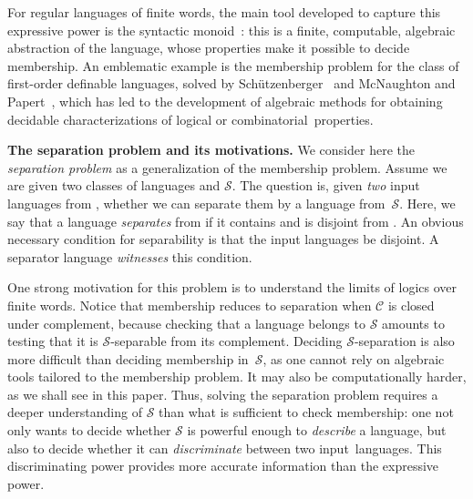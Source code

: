 \documentclass{LMCS}
\newcommand\mypar[1]{\par\medskip\noindent\textbf{#1}}
\newcommand\Sep{\ensuremath{\mathcal{S}}\xspace}
\newcommand\C{\ensuremath{\mathcal{C}}\xspace}
\theoremstyle{plain}
\begin{document}
For regular languages of finite words, the main tool developed to
capture this expressive power is the syntactic
monoid~\cite{pin:hal-00143946}: this is a finite, computable, algebraic
abstraction of the language, whose properties make it possible to
decide  membership. An emblematic example is the membership problem
for the class of first-order definable languages, solved by
Sch\"utzenberger~\cite{Schutzenberger:finite-monoids-having-only:1965:a}
and McNaughton and Papert~\cite{mcnaughton&papert:1971:counter}, which
has led to the development of algebraic methods for obtaining
decidable characterizations of logical
or combinatorial~properties.

\mypar{The separation problem and its motivations.} We consider here the
\emph{separation problem} as a generalization of the membership problem.
Assume we are given two classes of languages  and \Sep. The
question is, given \emph{two} input languages from , 
 whether we can separate them by a language from~\Sep. Here, we say
that a language \emph{separates}  from  if it contains  and
is disjoint from .  An obvious necessary condition for separability
is that the input languages  be disjoint. A separator language
\emph{witnesses} this condition.

\smallskip
One strong motivation for this problem is to understand the limits of
logics over finite words. Notice that membership reduces to separation
when \C is closed under complement, because checking that a language
belongs to \Sep amounts to testing that it is \Sep-separable from its
complement. Deciding \Sep-separation is also more difficult than
deciding membership in~\Sep, as one cannot rely on algebraic tools
tailored to the membership problem. It may also be computationally
harder, as we shall see in this paper. Thus, solving the separation
problem requires a deeper understanding of \Sep than what is
sufficient to check membership: one not only wants to decide whether
\Sep is powerful enough to \emph{describe} a language, but also to
decide whether it can \emph{discriminate} between two
input~languages. This discriminating power provides more accurate
information than the expressive power.
\end{document}

